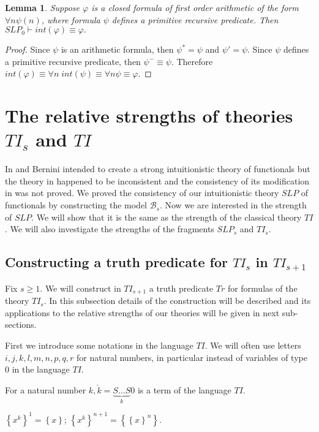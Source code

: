 \documentclass{asl}
\newtheorem{lemma}{Lemma}[section]
\theoremstyle{definition}
\begin{document}
\begin{lemma}
Suppose $\varphi$ is a closed formula of first order arithmetic of the form $\forall n\psi(n)$, where formula $\psi$ defines a primitive recursive predicate. Then 
$SLP_0\vdash int(\varphi)\equiv \varphi.$
\label{lemma:int}
\end{lemma}

\begin{proof}
Since $\psi$ is an arithmetic formula, then $\psi^*=\psi$ and $\psi'=\psi$. Since $\psi$ defines a primitive recursive predicate, then $\psi^-\equiv\psi$. Therefore $int(\varphi)\equiv \forall n \;int(\psi)\equiv \forall n \psi \equiv \varphi$.
\end{proof}



\section{The relative strengths of theories $TI_s$ and $TI$}
In \cite{bern76} and \cite{bern78} Bernini intended to create a strong intuitionistic theory of functionals but the theory in \cite{bern76} happened to be inconsistent and the consistency of its modification in \cite{bern78} was not proved. We proved the consistency of our intuitionistic theory $SLP$ of functionals by constructing the model $\mathcal{B}_s$. Now we are interested in the strength of $SLP$. We will show that it is the same as the strength of the classical theory $TI$. We will also investigate the strengths of the fragments $SLP_s$ and $TI_s$.

\subsection{Constructing a truth predicate for $TI_s$ in $TI_{s+1}$}
Fix $s\geqslant 1$. We will construct in $TI_{s+1}$ a truth predicate $Tr$ for formulas of the theory $TI_s$. In this subsection details of the construction will be described and its applications to the relative strengths of our theories will be given in next sub-sections.

First we introduce some notations in the language $TI$. We will often use letters $i,j,k,l,m,n,p,q,r$ for natural numbers, in particular instead of variables of type 0 in the language $TI$.

For a natural number $k, \check{k}=\underbrace{S\ldots S}_k0$ is a term of the language $TI$. 

$\left\lbrace x^k\right\rbrace ^1=\left\lbrace x\right\rbrace$;
$\left\lbrace x^k\right\rbrace ^{n+1}=\left\lbrace \left\lbrace x\right\rbrace ^n\right\rbrace$.
\end{document}
